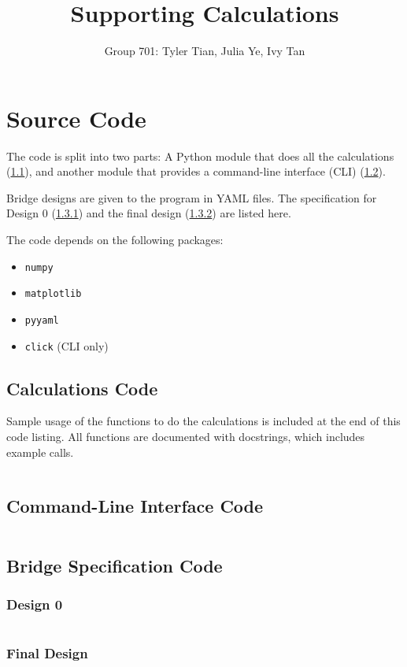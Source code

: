 \documentclass{article}
\title{Supporting Calculations}
\author{Group 701: Tyler Tian, Julia Ye, Ivy Tan}
\begin{document}
\maketitle

\section{Source Code}

The code is split into two parts: A Python module that does all the calculations (\ref{sec:calc}), and another module
that provides a command-line interface (CLI) (\ref{sec:cli}).

Bridge designs are given to the program in YAML files. The specification for Design 0 (\ref{sec:design0}) and the final
design (\ref{sec:design}) are listed here.

The code depends on the following packages:
\begin{itemize}
    \setlength\itemsep{0em}
    \item \texttt{numpy}
    \item \texttt{matplotlib}
    \item \texttt{pyyaml}
    \item \texttt{click} (CLI only)
\end{itemize}

\subsection{Calculations Code}
\label{sec:calc}

Sample usage of the functions to do the calculations is included at the end of this code listing. All functions are
documented with docstrings, which includes example calls.

\inputminted[linenos, breaklines, fontsize=\small]{python}{calculate.py}
\pagebreak

\subsection{Command-Line Interface Code}
\label{sec:cli}

\inputminted[linenos, breaklines, fontsize=\small]{python}{bridgedesigner.py}
\pagebreak

\subsection{Bridge Specification Code}

\subsubsection{Design 0}
\label{sec:design0}

\inputminted[linenos, breaklines, fontsize=\small]{yaml}{design0.yaml}
\pagebreak

\subsubsection{Final Design}
\label{sec:design}

\inputminted[linenos, breaklines, fontsize=\small]{yaml}{new.yaml}
\pagebreak
\end{document}

